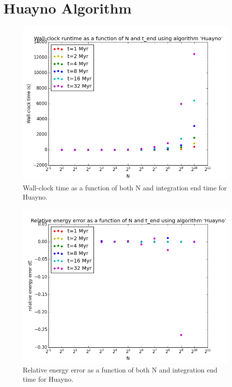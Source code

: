 \documentclass{aa}
\begin{document}
\section{Huayno Algorithm}
  \citep{2012NewA...17..711P}
  
   \begin{figure}
   \centering
   \includegraphics[width=\hsize]{../GravitationalDynamics/plots/CA_GD_TLRH_s1603221_SS_s1617451_Huayno_runtime.png}
      \caption{Wall-clock time as a function of both N and integration 
               end time for Huayno.
              }
         \label{fig:Huayno_runtime}
   \end{figure}
   
   \begin{figure}
   \centering
   \includegraphics[width=\hsize]{../GravitationalDynamics/plots/CA_GD_TLRH_s1603221_SS_s1617451_Huayno_dE.png}
      \caption{Relative energy error as a function of both N and integration 
               end time for Huayno.
              }
         \label{fig:Huayno_dE}
   \end{figure}
\end{document}
